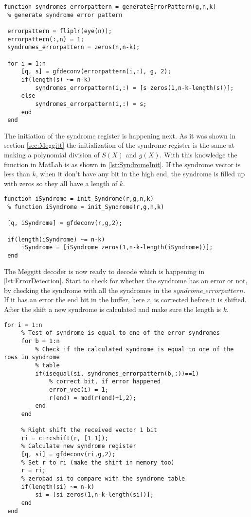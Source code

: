 \documentclass[Main]{subfiles}
\begin{document}
\begin{lstlisting}[caption=Error pattern creation, style=Code-Matlab, label=lst:ErrorPatternCreate]
 function syndromes_errorpattern = generateErrorPattern(g,n,k)
 % generate syndrome error pattern
 
 errorpattern = fliplr(eye(n));
 errorpattern(:,n) = 1;
 syndromes_errorpattern = zeros(n,n-k);
 
 for i = 1:n
     [q, s] = gfdeconv(errorpattern(i,:), g, 2);
     if(length(s) ~= n-k)
         syndromes_errorpattern(i,:) = [s zeros(1,n-k-length(s))];
     else
         syndromes_errorpattern(i,:) = s;
     end
 end
\end{lstlisting}

The initiation of the syndrome register is happening next.
As it was shown in section \ref{sec:Meggitt} the initialization of the syndrome register is the same at making a polynomial division of $S(X)$ and $g(X)$.
With this knowledge the function in MatLab is as shown in \codeTitle \ref{lst:SyndromeInit}.
If the syndrome vector is less than $k$, when it don't have any bit in the high end, the syndrome is filled up with zeros so they all have a length of $k$.

\begin{lstlisting}[caption=Syndrome initialization, style=Code-Matlab, label=lst:SyndromeInit]
 function iSyndrome = init_Syndrome(r,g,n,k)
 % function iSyndrome = init_Syndrome(r,g,n,k)
 
 [q, iSyndrome] = gfdeconv(r,g,2);
 
 if(length(iSyndrome) ~= n-k)
     iSyndrome = [iSyndrome zeros(1,n-k-length(iSyndrome))];
 end
\end{lstlisting}

The Meggitt decoder is now ready to decode which is happening in \codeTitle \ref{lst:ErrorDetection}.
Start to check for whether the syndrome has an error or not, by checking the syndrome with all the syndromes in the $syndrome\_errorpattern$.
If it has an error the end bit in the buffer, here $r$, is corrected before it is shifted.
After the shift a new syndrome is calculated and make sure the length is $k$.

\begin{lstlisting}[caption=Error detection, style=Code-Matlab, label=lst:ErrorDetection]
 for i = 1:n
     % Test of syndrome is equal to one of the error syndromes
     for b = 1:n
         % Check if the calculated syndrome is equal to one of the rows in syndrome
         % table
         if(isequal(si, syndromes_errorpattern(b,:))==1)
             % correct bit, if error happened
             error_vec(i) = 1;
             r(end) = mod(r(end)+1,2);
         end
     end
     
     % Right shift the received vector 1 bit
     ri = circshift(r, [1 1]);
     % Calculate new syndrome register
     [q, si] = gfdeconv(ri,g,2);
     % Set r to ri (make the shift in memory too)
     r = ri;
     % zeropad si to compare with the syndrome table
     if(length(si) ~= n-k)
         si = [si zeros(1,n-k-length(si))];
     end
 end
\end{lstlisting}
\end{document}

